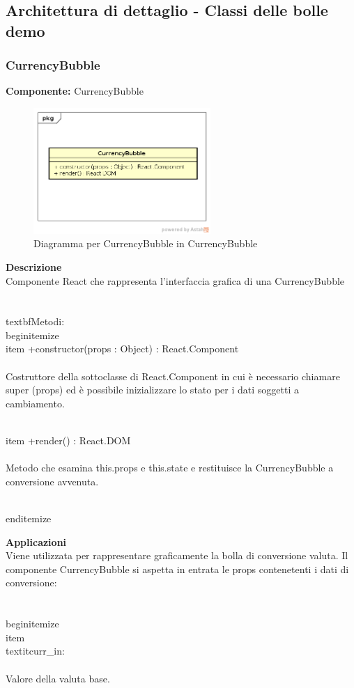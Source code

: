 \subsection{Architettura di dettaglio - Classi delle bolle demo}\subsubsection{CurrencyBubble}
\textbf{Componente:}  CurrencyBubble\\
   \FloatBarrier
   \begin{figure}[ht]
   \centering
   \includegraphics[width=0.6\textwidth]{img/single-CurrencyBubble}
   \caption{{Diagramma per CurrencyBubble in CurrencyBubble}}
\end{figure}
\FloatBarrier
\textbf{Descrizione}\\
Componente React che rappresenta l'interfaccia grafica di una CurrencyBubble
\\\\
\\textbf{Metodi:} 
\\begin{itemize}
\\item +constructor(props : Object) : React.Component 
\\\\
Costruttore della sottoclasse di React.Component in cui è necessario chiamare super (props) ed è possibile inizializzare lo stato per i dati soggetti a cambiamento.

\\item +render() : React.DOM 
\\\\
Metodo che esamina this.props e this.state e restituisce la CurrencyBubble a conversione avvenuta.

\\end{itemize} 


\textbf{Applicazioni}\\
Viene utilizzata per rappresentare graficamente la bolla di conversione valuta.
Il componente CurrencyBubble si aspetta in entrata le props contenetenti i dati di conversione: \\\\
\\begin{itemize}
\\item \\textit{curr_in}:
\\\\
Valore della valuta base.

